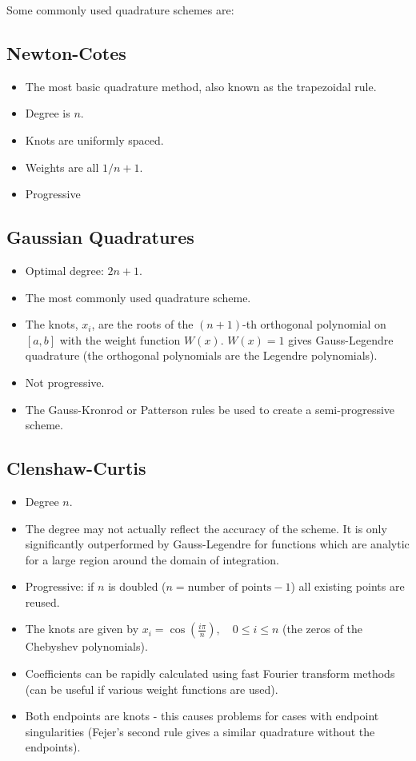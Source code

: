 Some commonly used quadrature schemes are:

\subsection{Newton-Cotes}
\begin{itemize}
\item The most basic quadrature method, also known as the trapezoidal rule.
\item Degree is $n$.
\item Knots are uniformly spaced.
\item Weights are all $1/n + 1$.
\item Progressive
\end{itemize}

\subsection{Gaussian Quadratures}
\begin{itemize}
\item Optimal degree: $2n +1$.
\item The most commonly used quadrature scheme.
\item The knots, $x_i$, are the roots of the $(n+1)$-th orthogonal polynomial on $[a,b]$ with the weight function $W(x)$. $W(x) = 1$ gives Gauss-Legendre quadrature (the orthogonal polynomials are the Legendre polynomials).
\item Not progressive.
\item The Gauss-Kronrod or Patterson rules be used to create a semi-progressive scheme.
\end{itemize}

\subsection{Clenshaw-Curtis}
\begin{itemize}
\item Degree $n$.
\item The degree may not actually reflect the accuracy of the scheme. It is only significantly outperformed by Gauss-Legendre for functions which are analytic for a large region around the domain of integration.\cite{Trefethen2008}
\item Progressive: if $n$ is doubled ($n = \text{number of points} - 1$) all existing points are reused.
\item The knots are given by $x_i = \cos(\frac{i \pi}{n}), \quad 0 \leq i \leq n$ (the zeros of the Chebyshev polynomials).
\item Coefficients can be rapidly calculated using fast Fourier transform methods (can be useful if various weight functions are used).
\item Both endpoints are knots - this causes problems for cases with endpoint singularities (Fejer's second rule gives a similar quadrature without the endpoints).
\end{itemize}


